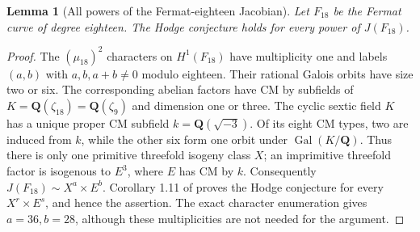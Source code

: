 \documentclass[11pt,reqno]{article}
\theoremstyle{emphasizedplain}
\newtheorem{lemma}[theorem]{Lemma}
\theoremstyle{emphasizeddefinition}
\theoremstyle{emphasizeddefinition}
\newcommand{\Q}{\mathbf Q}
\begin{document}
\begin{lemma}[All powers of the Fermat-eighteen Jacobian]\label{p:fermat18}
Let $F_{18}$ be the Fermat curve of degree eighteen. The Hodge
conjecture holds for every power of $J(F_{18})$.
\end{lemma}
\begin{proof}
The $(\mu_{18})^2$ characters on $H^1(F_{18})$ have multiplicity
one and labels $(a,b)$ with $a,b,a+b\ne0$ modulo eighteen.
Their rational Galois orbits have size two or six. The corresponding
abelian factors have CM by subfields of
$K=\Q(\zeta_{18})=\Q(\zeta_9)$ and dimension one or three.
The cyclic sextic field $K$ has a unique proper CM subfield
$k=\Q(\sqrt{-3})$. Of its eight CM types, two are induced from
$k$, while the other six form one orbit under $\operatorname{Gal}(K/\Q)$.
Thus there is only one primitive threefold isogeny class $X$;
an imprimitive threefold factor is isogenous to $E^3$, where
$E$ has CM by $k$. Consequently $J(F_{18})\sim X^a\times E^b$.
Corollary 1.11 of \cite{MilneTateStandard} proves the Hodge
conjecture for every $X^r\times E^s$, and hence the assertion.
The exact character enumeration gives $a=36,b=28$, although
these multiplicities are not needed for the argument.
\end{proof}
\end{document}

